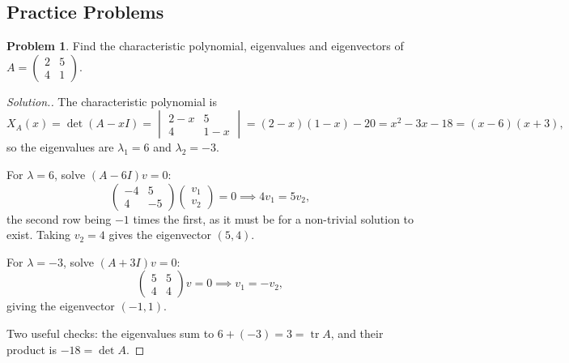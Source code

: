 \documentclass[11pt,a4paper]{article}
\theoremstyle{definition}
\newtheorem{problemx}{Problem}[section]
\newenvironment{problem}{\begin{problemx}}{\end{problemx}}
\newenvironment{solution}
  {\renewcommand{\qedsymbol}{}\begin{proof}[\textit{Solution}.]}
  {\end{proof}}
\begin{document}
\subsection{Practice Problems}

\begin{problem}
Find the characteristic polynomial, eigenvalues and eigenvectors of
$A=\begin{pmatrix}2&5\\4&1\end{pmatrix}$.
\end{problem}
\begin{solution}
The characteristic polynomial is
$$X_A(x)=\det(A-xI)=\begin{vmatrix}2-x&5\\4&1-x\end{vmatrix}
=(2-x)(1-x)-20=x^2-3x-18=(x-6)(x+3),$$
so the eigenvalues are $\lambda_1=6$ and $\lambda_2=-3$.

For $\lambda=6$, solve $(A-6I)v=0$:
$$\begin{pmatrix}-4&5\\4&-5\end{pmatrix}
\begin{pmatrix}v_1\\v_2\end{pmatrix}=0
\implies 4v_1=5v_2,$$
the second row being $-1$ times the first, as it must be for a non-trivial
solution to exist. Taking $v_2=4$ gives the eigenvector $(5,4)$.

For $\lambda=-3$, solve $(A+3I)v=0$:
$$\begin{pmatrix}5&5\\4&4\end{pmatrix}v=0\implies v_1=-v_2,$$
giving the eigenvector $(-1,1)$.

Two useful checks: the eigenvalues sum to $6+(-3)=3=\operatorname{tr}A$, and
their product is $-18=\det A$.
\end{solution}
\end{document}
